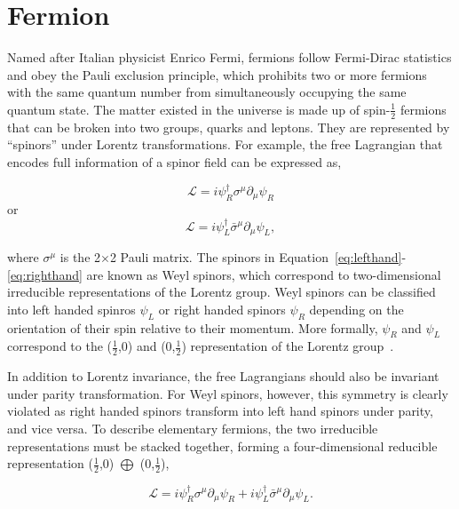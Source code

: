 \section{Fermion}
\label{sec:Fermion}

Named after Italian physicist Enrico Fermi, fermions follow Fermi-Dirac statistics and obey the Pauli exclusion principle, which prohibits two or more fermions with the same quantum number from simultaneously occupying the same quantum state. The matter existed in the universe is made up of spin-$\frac{1}{2}$ fermions that can be broken into two groups, quarks and leptons. They are represented by ``spinors'' under Lorentz transformations. For example, the free Lagrangian that encodes full information of a spinor field can be expressed as,

\begin{equation}
\label{eq:lefthand}
\mathcal{L}=i\psi_{R}^{\dagger}\sigma^{\mu}\partial_{\mu}\psi_{R}
\end{equation}
or
\begin{equation}
\label{eq:righthand}
\mathcal{L}=i\psi_{L}^{\dagger}\bar{\sigma}^{\mu}\partial_{\mu}\psi_{L},
\end{equation}

where $\sigma^{\mu}$ is the 2$\times$2 Pauli matrix. The spinors in Equation~\ref{eq:lefthand}-\ref{eq:righthand} are known as Weyl spinors, which correspond to two-dimensional irreducible representations of the Lorentz group. Weyl spinors can be classified into left handed spinros $\psi_{L}$ or right handed spinors $\psi_{R}$ depending on the orientation of their spin relative to their momentum. More formally, $\psi_{R}$ and $\psi_{L}$ correspond to the ($\frac{1}{2}$,0) and (0,$\frac{1}{2}$) representation of the Lorentz group~\cite{zee:group}.

In addition to Lorentz invariance, the free Lagrangians should also be invariant under parity transformation. For Weyl spinors, however, this symmetry is clearly violated as right handed spinors transform into left hand spinors under parity, and vice versa. To describe elementary fermions, the two irreducible representations must be stacked together, forming a four-dimensional reducible representation ($\frac{1}{2}$,0) $\bigoplus$ (0,$\frac{1}{2}$),

\begin{equation}
\label{eq:leftandright}
\mathcal{L}=i\psi_{R}^{\dagger}\sigma^{\mu}\partial_{\mu}\psi_{R}+i\psi_{L}^{\dagger}\bar{\sigma}^{\mu}\partial_{\mu}\psi_{L}.
\end{equation}

